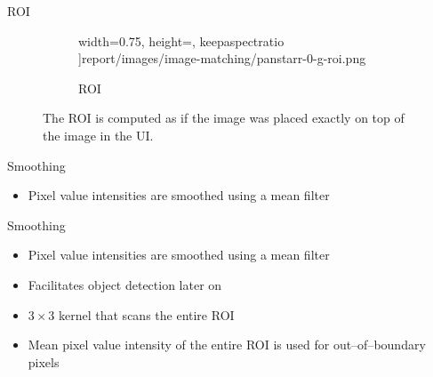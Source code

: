 \begin{frame}{ROI}
\begin{figure}[H]
\begin{subfigure}{.5\textwidth}
                width=0.75\textwidth,
                height=\textheight,
                keepaspectratio
          ]{report/images/image-matching/panstarr-0-g-roi.png}
          \caption{\panstarrs ROI}
        \end{subfigure}
        \caption{The ROI is computed as if the \panstarrs image was placed exactly on top of the \usno image in the UI.}
    \end{figure}
\end{frame}

\begin{frame}{Smoothing}
    \begin{itemize}
        \item Pixel value intensities are smoothed using a mean filter
    \end{itemize}
\end{frame}

\begin{frame}{Smoothing}
    \begin{itemize}
        \item Pixel value intensities are smoothed using a mean filter
        \item Facilitates object detection later on
        \item $3 \times 3$ kernel that scans the entire ROI
        \item Mean pixel value intensity of the entire ROI is used for out--of--boundary pixels
    \end{itemize}
\end{frame}

